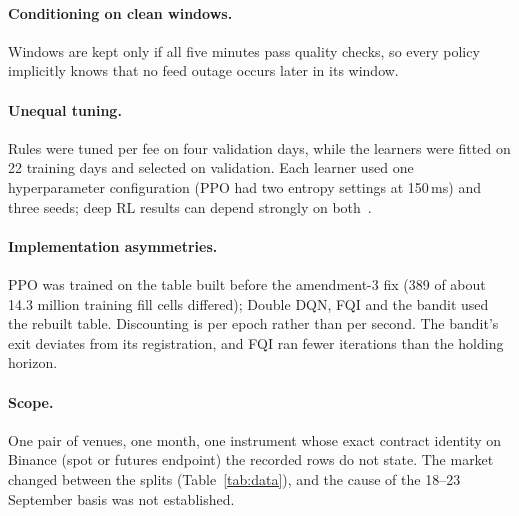 \documentclass[12pt,a4paper]{article}
\begin{document}
\paragraph{Conditioning on clean windows.} Windows are kept only if all five minutes pass quality
checks, so every policy implicitly knows that no feed outage occurs later in its window.

\paragraph{Unequal tuning.} Rules were tuned per fee on four validation days, while the learners
were fitted on 22 training days and selected on validation. Each learner used one
hyperparameter configuration (PPO had two entropy settings at 150\,ms) and three seeds;
deep RL results can depend strongly on both~\cite{henderson}.

\paragraph{Implementation asymmetries.} PPO was trained on the table built before the amendment-3
fix (389 of about 14.3 million training fill cells differed); Double DQN, FQI and the bandit
used the rebuilt table. Discounting is per epoch rather than per second. The bandit's exit
deviates from its registration, and FQI ran fewer iterations than the holding horizon.

\paragraph{Scope.} One pair of venues, one month, one instrument whose exact contract identity on
Binance (spot or futures endpoint) the recorded rows do not state. The market changed
between the splits (Table~\ref{tab:data}), and the cause of the 18--23 September basis was not
established.

\end{document}

